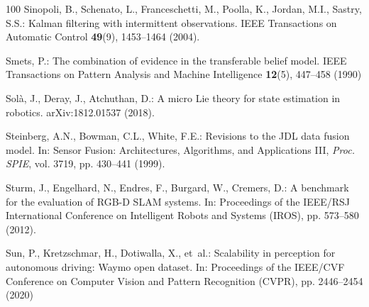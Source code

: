 \documentclass[graybox,envcountchap]{style/SNmono}
\begin{document}
\begin{thebibliography}{100}
Sinopoli, B., Schenato, L., Franceschetti, M., Poolla, K., Jordan, M.I.,
  Sastry, S.S.: Kalman filtering with intermittent observations.
\newblock IEEE Transactions on Automatic Control \textbf{49}(9), 1453--1464
  (2004).
\newblock {}


{\color{red} 
Smets, P.: The combination of evidence in the transferable belief model.
\newblock IEEE Transactions on Pattern Analysis and Machine Intelligence
  \textbf{12}(5), 447--458 (1990)

\par}
{\color{red} 
Sol{\`a}, J., Deray, J., Atchuthan, D.: A micro {L}ie theory for state
  estimation in robotics.
\newblock arXiv:1812.01537 (2018).
\newblock {}

\par}

Steinberg, A.N., Bowman, C.L., White, F.E.: Revisions to the {JDL} data fusion
  model.
\newblock In: Sensor Fusion: Architectures, Algorithms, and Applications III,
  \emph{Proc. SPIE}, vol. 3719, pp. 430--441 (1999).
\newblock {}



Sturm, J., Engelhard, N., Endres, F., Burgard, W., Cremers, D.: A benchmark for
  the evaluation of {RGB-D SLAM} systems.
\newblock In: Proceedings of the IEEE/RSJ International Conference on
  Intelligent Robots and Systems (IROS), pp. 573--580 (2012).
\newblock {}


{\color{red} 
Sun, P., Kretzschmar, H., Dotiwalla, X., et~al.: Scalability in perception for
  autonomous driving: {W}aymo open dataset.
\newblock In: Proceedings of the IEEE/CVF Conference on Computer Vision and
  Pattern Recognition (CVPR), pp. 2446--2454 (2020)

}
\end{thebibliography}
\end{document}
